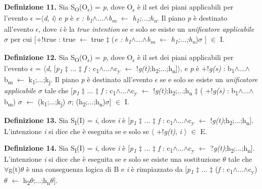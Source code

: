 \smallskip
\textbf{Definizione 11.} Sia S\textsubscript{O}(O\textsubscript{\textit{$\epsilon$}}) = \textit{p}, dove O\textsubscript{\textit{$\epsilon$}} \`e il set dei piani applicabili per l'evento \textit{$\epsilon$} =$\langle$\textit{d}, \textit{i}$\rangle$ e \textit{p} \`e \textit{e : b\textsubscript{1}$\land$...$\land$b\textsubscript{m} $\leftarrow$ h\textsubscript{1};...;h\textsubscript{n}}. Il piano \textit{p} \`e destinato all'evento \textit{$\epsilon$}, dove \textit{i} \`e la \textit{true intention} se e solo se esiste un \textit{unificatore applicabile} \textit{$\sigma$} per cui [+!true : true $\leftarrow$ true $\ddagger$ (\textit{e : b\textsubscript{1}$\land$...$\land$b\textsubscript{m} $\leftarrow$ h\textsubscript{1};...;h\textsubscript{n}})$\sigma$ ] $\in$ I.

\smallskip
\textbf{Definizione 12.} Sia S\textsubscript{O}(O\textsubscript{\textit{$\epsilon$}}) = \textit{p}, dove O\textsubscript{\textit{$\epsilon$}} \`e il set dei piani applicabili per l'evento \textit{$\epsilon$} = $\langle$\textit{d}, [\textit{p\textsubscript{1}} $\ddagger$ ... $\ddagger$ \textit{f} : c\textsubscript{1}$\land$...$\land$c\textsubscript{y} $\leftarrow$ !\textit{g(t)};h\textsubscript{2};...;h\textsubscript{n}]$\rangle$, e \textit{p} \`e +!\textit{g(s)} : b\textsubscript{1}$\land$...$\land$b\textsubscript{m} $\leftarrow$ k\textsubscript{1};...;k\textsubscript{j}. Il piano \textit{p} \`e destinato all'evento \textit{$\epsilon$} se e solo se esiste un \textit{unificatore applicabile} \textit{$\sigma$} tale che [\textit{p\textsubscript{1}} $\ddagger$ ... $\ddagger$ \textit{f} : c\textsubscript{1}$\land$...$\land$c\textsubscript{y} $\leftarrow$ !\textit{g(t)};h\textsubscript{2};...;h\textsubscript{n} $\ddagger$ (
+!\textit{g(s)} : b\textsubscript{1}$\land$...$\land$b\textsubscript{m}) $\sigma$ $\leftarrow$ (k\textsubscript{1};...;k\textsubscript{j}) $\sigma$; (h\textsubscript{2};...;h\textsubscript{n})$\sigma$] $\in$ I.

\smallskip
\textbf{Definizione 13.} Sia S\textsubscript{I}(I) = \textit{i}, dove \textit{i} \`e [\textit{p\textsubscript{1}} $\ddagger$ ... $\ddagger$ \textit{f} : c\textsubscript{1}$\land$...$\land$c\textsubscript{y} $\leftarrow$ !\textit{g(t)};h\textsubscript{2};...;h\textsubscript{n}]. L'intenzione \textit{i} si dice che \`e eseguita  se e solo se $\langle$ +!\textit{g(t)}, \textit{i} $\rangle$ $\in$ E.

\smallskip
\textbf{Definizione 14.} Sia S\textsubscript{I}(I) = \textit{i}, dove \textit{i} \`e [\textit{p\textsubscript{1}} $\ddagger$ ... $\ddagger$ \textit{f} : c\textsubscript{1}$\land$...$\land$c\textsubscript{y} $\leftarrow$ ?\textit{g(t)};h\textsubscript{2};...;h\textsubscript{n}]. L'intenzione \textit{i} si dice che \`e eseguita  se e solo se esiste una sostituzione \textit{$\theta$} tale che $\forall$g(t)\textit{$\theta$} \`e una conseguenza logica di B e \textit{i} \`e rimpiazzato da [\textit{p\textsubscript{1}} $\ddagger$ ... $\ddagger$ (\textit{f} : c\textsubscript{1}$\land$...$\land$c\textsubscript{y})\textit{$\theta$} $\leftarrow$ h\textsubscript{2}\textit{$\theta$};...;h\textsubscript{n}\textit{$\theta$}].

